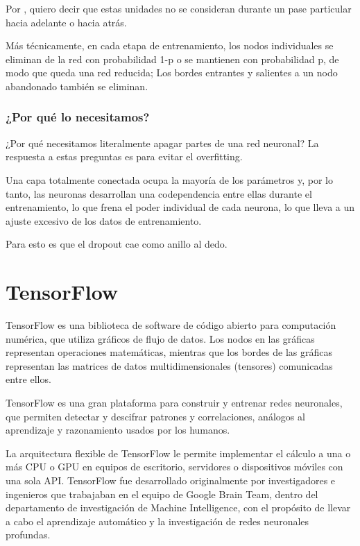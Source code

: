 \documentclass[10pt, fleqn, journal]{IEEEtran}
\newcommand \Quote              {\qq}                           %
\theoremstyle{break}                                            %
\begin{document}
      Por \Quote{ignorar}, quiero decir que estas unidades no se consideran durante un pase particular 
      hacia adelante o hacia atrás.

      Más técnicamente, en cada etapa de entrenamiento, los nodos individuales se eliminan 
      de la red con probabilidad 1-p o se mantienen con probabilidad p, 
      de modo que queda una red reducida; Los bordes entrantes y salientes a un 
      nodo abandonado también se eliminan.

      \subsubsection{¿Por qué lo necesitamos?}
        ¿Por qué necesitamos literalmente apagar partes de una red neuronal?
        La respuesta a estas preguntas es para evitar el overfitting.

        Una capa totalmente conectada ocupa la mayoría de los parámetros y, por lo 
        tanto, las neuronas desarrollan una codependencia entre 
        ellas durante el entrenamiento, lo que frena el poder individual de cada neurona, 
        lo que lleva a un ajuste excesivo de los datos de entrenamiento.

        Para esto es que el dropout cae como anillo al dedo.


  \section{TensorFlow}

    TensorFlow es una biblioteca de software de código abierto para computación numérica, que utiliza gráficos 
    de flujo de datos. Los nodos en las gráficas representan operaciones matemáticas, mientras que los 
    bordes de las gráficas representan las matrices de datos multidimensionales (tensores) 
    comunicadas entre ellos.

    TensorFlow es una gran plataforma para construir y entrenar redes neuronales, que permiten 
    detectar y descifrar patrones y correlaciones, análogos al aprendizaje y razonamiento usados 
    por los humanos.

    La arquitectura flexible de TensorFlow le permite implementar el cálculo a una o más CPU o GPU
    en equipos de escritorio, servidores o dispositivos móviles con una sola API. TensorFlow fue
    desarrollado originalmente por investigadores e ingenieros que trabajaban en el equipo de Google
    Brain Team, dentro del departamento de investigación de Machine Intelligence, con el propósito de
    llevar a cabo el aprendizaje automático y la investigación de redes neuronales profundas.
\end{document}
